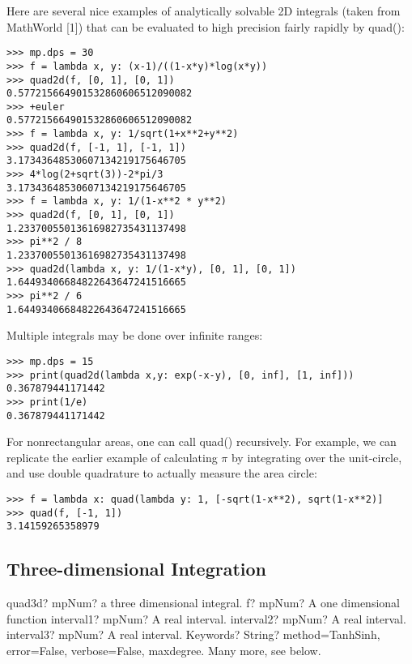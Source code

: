 \vpara
Here are several nice examples of analytically solvable 2D integrals (taken from MathWorld [1]) that can be evaluated to high precision fairly rapidly by quad():

\begin{lstlisting}
>>> mp.dps = 30
>>> f = lambda x, y: (x-1)/((1-x*y)*log(x*y))
>>> quad2d(f, [0, 1], [0, 1])
0.577215664901532860606512090082
>>> +euler
0.577215664901532860606512090082
>>> f = lambda x, y: 1/sqrt(1+x**2+y**2)
>>> quad2d(f, [-1, 1], [-1, 1])
3.17343648530607134219175646705
>>> 4*log(2+sqrt(3))-2*pi/3
3.17343648530607134219175646705
>>> f = lambda x, y: 1/(1-x**2 * y**2)
>>> quad2d(f, [0, 1], [0, 1])
1.23370055013616982735431137498
>>> pi**2 / 8
1.23370055013616982735431137498
>>> quad2d(lambda x, y: 1/(1-x*y), [0, 1], [0, 1])
1.64493406684822643647241516665
>>> pi**2 / 6
1.64493406684822643647241516665
\end{lstlisting}

Multiple integrals may be done over infinite ranges:

\begin{lstlisting}
>>> mp.dps = 15
>>> print(quad2d(lambda x,y: exp(-x-y), [0, inf], [1, inf]))
0.367879441171442
>>> print(1/e)
0.367879441171442
\end{lstlisting}

For nonrectangular areas, one can call quad() recursively. For example, we can replicate the earlier example of calculating $\pi$ by integrating over the unit-circle, and use double quadrature to actually measure the area circle:

\begin{lstlisting}
>>> f = lambda x: quad(lambda y: 1, [-sqrt(1-x**2), sqrt(1-x**2)]
>>> quad(f, [-1, 1])
3.14159265358979
\end{lstlisting}



\subsection{Three-dimensional Integration}

\begin{mpFunctionsExtract}
	\mpFunctionFive
	{quad3d? mpNum? a three dimensional integral.}
	{f? mpNum? A one dimensional function}
	{interval1? mpNum? A real interval.}	
	{interval2? mpNum? A real interval.}		
	{interval3? mpNum? A real interval.}	
	{Keywords? String? method=TanhSinh, error=False, verbose=False, maxdegree. Many more, see below.}	
\end{mpFunctionsExtract}

